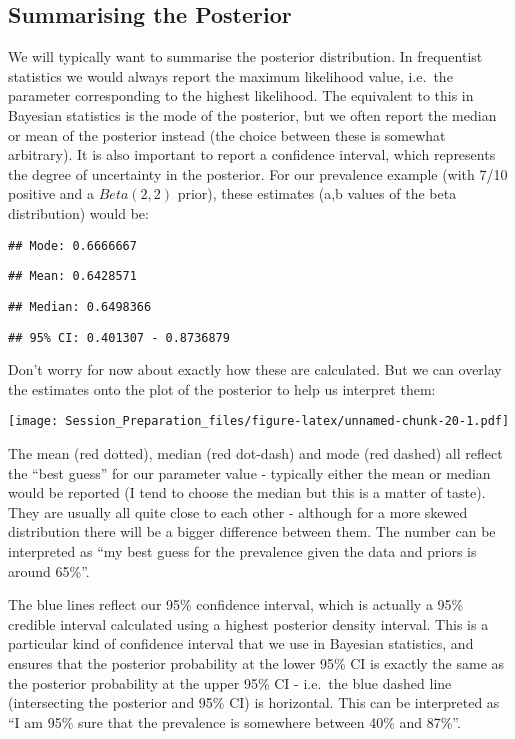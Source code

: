 \documentclass[
  12pt,
]{article}
\begin{document}
\hypertarget{summarising-the-posterior}{%
\subsection{Summarising the Posterior}\label{summarising-the-posterior}}

We will typically want to summarise the posterior distribution. In
frequentist statistics we would always report the maximum likelihood
value, i.e.~the parameter corresponding to the highest likelihood. The
equivalent to this in Bayesian statistics is the mode of the posterior,
but we often report the median or mean of the posterior instead (the
choice between these is somewhat arbitrary). It is also important to
report a confidence interval, which represents the degree of uncertainty
in the posterior. For our prevalence example (with 7/10 positive and a
\(Beta(2,2)\) prior), these estimates (a,b values of the beta
distribution) would be:

\begin{verbatim}
## Mode: 0.6666667
\end{verbatim}

\begin{verbatim}
## Mean: 0.6428571
\end{verbatim}

\begin{verbatim}
## Median: 0.6498366
\end{verbatim}

\begin{verbatim}
## 95% CI: 0.401307 - 0.8736879
\end{verbatim}

Don't worry for now about exactly how these are calculated. But we can
overlay the estimates onto the plot of the posterior to help us
interpret them:

\texttt{[image: Session\_Preparation\_files/figure-latex/unnamed-chunk-20-1.pdf]}

The mean (red dotted), median (red dot-dash) and mode (red dashed) all
reflect the ``best guess'' for our parameter value - typically either
the mean or median would be reported (I tend to choose the median but
this is a matter of taste). They are usually all quite close to each
other - although for a more skewed distribution there will be a bigger
difference between them. The number can be interpreted as ``my best
guess for the prevalence given the data and priors is around 65\%''.

The blue lines reflect our 95\% confidence interval, which is actually a
95\% credible interval calculated using a highest posterior density
interval. This is a particular kind of confidence interval that we use
in Bayesian statistics, and ensures that the posterior probability at
the lower 95\% CI is exactly the same as the posterior probability at
the upper 95\% CI - i.e.~the blue dashed line (intersecting the
posterior and 95\% CI) is horizontal. This can be interpreted as ``I am
95\% sure that the prevalence is somewhere between 40\% and 87\%''.
\end{document}

